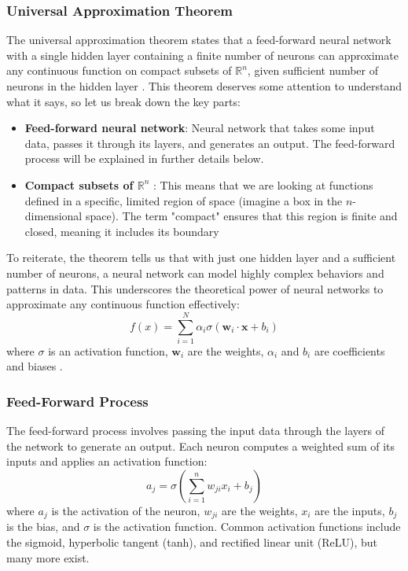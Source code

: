\documentclass[english,11pt,a4paper,titlepage]{article}
\begin{document}
	\subsubsection*{Universal Approximation Theorem}
	The universal approximation theorem states that a feed-forward neural network with a single hidden layer containing a finite number of neurons can approximate any continuous function on compact subsets of \(\mathbb{R}^n\), given sufficient number of neurons in the hidden layer \cite{hornikMultilayerFeedforwardNetworks1989}. This theorem deserves some attention to understand what it says, so let us break down the key parts:
	\begin{itemize}
		\item \textbf{Feed-forward neural network}: Neural network that takes some input data, passes it through its layers, and generates an output. The feed-forward process will be explained in further details below.
		\item \textbf{Compact subsets of \( \mathbb{R}^n \) }: This means that we are looking at functions defined in a specific, limited region of space (imagine a box in the \(n\)-dimensional space). The term "compact" ensures that this region is finite and closed, meaning it includes its boundary
	\end{itemize}
	To reiterate, the theorem tells us that with just one hidden layer and a sufficient number of neurons, a neural network can model highly complex behaviors and patterns in data. This underscores the theoretical power of neural networks to approximate any continuous function effectively:
	\begin{equation*}
		f(x) = \sum_{i=1}^{N} \alpha_i \sigma(\mathbf{w}_i \cdot \mathbf{x} + b_i)
	\end{equation*}
	where \( \sigma \) is an activation function, \( \mathbf{w}_i \) are the weights, \( \alpha_i \) and \( b_i \) are coefficients and biases \cite{hornikMultilayerFeedforwardNetworks1989}.
	
	\subsubsection*{Feed-Forward Process}
	The feed-forward process involves passing the input data through the layers of the network to generate an output. Each neuron computes a weighted sum of its inputs and applies an activation function:
	\begin{equation*}
		a_j = \sigma \left( \sum_{i=1}^{n} w_{ji} x_i + b_j \right)
	\end{equation*}
	where \( a_j \) is the activation of the neuron, \( w_{ji} \) are the weights, \( x_i \) are the inputs, \( b_j \) is the bias, and \( \sigma \) is the activation function. Common activation functions include the sigmoid, hyperbolic tangent (tanh), and rectified linear unit (ReLU), but many more exist.\\
	
\end{document}
